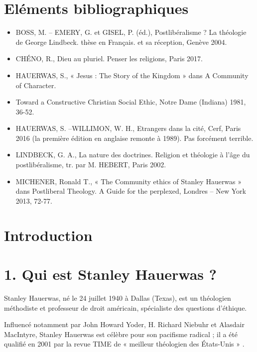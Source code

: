 
\section{Eléments bibliographiques}
\begin{itemize}
    \item BOSS, M. – EMERY, G. et GISEL, P. (éd.), Postlibéralisme ? La théologie de George Lindbeck. thèse en Français. 
et sa réception, Genève 2004.
    \item CHÉNO, R., Dieu au pluriel. Penser les religions, Paris 2017.
    \item HAUERWAS, S., « Jesus : The Story of the Kingdom » dans A Community of Character.
    \item Toward a Constructive Christian Social Ethic, Notre Dame (Indiana) 1981, 36-52.
    \item HAUERWAS, S. –WILLIMON, W. H., Etrangers dans la cité, Cerf, Paris 2016 (la première
édition en anglaise remonte à 1989). Pas forcément terrible. 
    \item LINDBECK, G. A., La nature des doctrines. Religion et théologie à l’âge du postlibéralisme,
tr. par M. HEBERT, Paris 2002.
    \item MICHENER, Ronald T., « The Community ethics of Stanley Hauerwas » dans Postliberal
Theology. A Guide for the perplexed, Londres – New York 2013, 72-77.
\end{itemize}



\section{Introduction}
\section{1. Qui est Stanley Hauerwas ?}

Stanley Hauerwas, né le 24 juillet 1940 à Dallas (Texas), est un théologien méthodiste et professeur de droit américain, spécialiste des questions d'éthique.
 
Influencé notamment par John Howard Yoder, H. Richard Niebuhr et Alasdair MacIntyre, Stanley Hauerwas est célèbre pour son pacifisme radical ; il a été qualifié en 2001 par la revue TIME de « meilleur théologien des États-Unis » .

 
 
